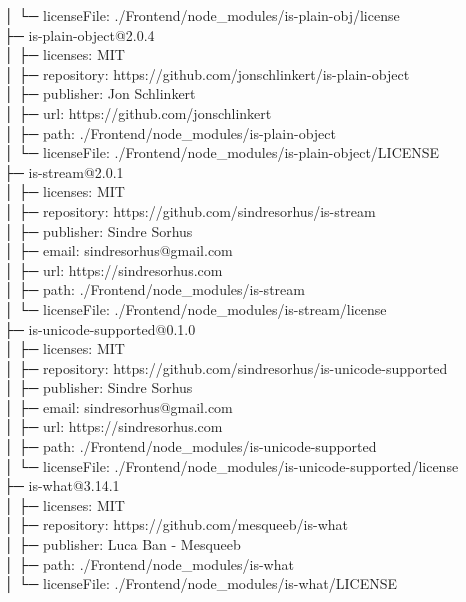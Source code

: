 \documentclass[
    paper=a4,
    twoside=false,
    parskip=half,
    listof=entryprefix,
    listof=totoc,
    index=totoc,
    bibliography=totoc,
    headsepline,
]{scrbook}
\begin{document}
    │  └─ licenseFile: ./Frontend/node\_modules/is-plain-obj/license\\
    ├─ is-plain-object@2.0.4\\
    │  ├─ licenses: MIT\\
    │  ├─ repository: https://github.com/jonschlinkert/is-plain-object\\
    │  ├─ publisher: Jon Schlinkert\\
    │  ├─ url: https://github.com/jonschlinkert\\
    │  ├─ path: ./Frontend/node\_modules/is-plain-object\\
    │  └─ licenseFile: ./Frontend/node\_modules/is-plain-object/LICENSE\\
    ├─ is-stream@2.0.1\\
    │  ├─ licenses: MIT\\
    │  ├─ repository: https://github.com/sindresorhus/is-stream\\
    │  ├─ publisher: Sindre Sorhus\\
    │  ├─ email: sindresorhus@gmail.com\\
    │  ├─ url: https://sindresorhus.com\\
    │  ├─ path: ./Frontend/node\_modules/is-stream\\
    │  └─ licenseFile: ./Frontend/node\_modules/is-stream/license\\
    ├─ is-unicode-supported@0.1.0\\
    │  ├─ licenses: MIT\\
    │  ├─ repository: https://github.com/sindresorhus/is-unicode-supported\\
    │  ├─ publisher: Sindre Sorhus\\
    │  ├─ email: sindresorhus@gmail.com\\
    │  ├─ url: https://sindresorhus.com\\
    │  ├─ path: ./Frontend/node\_modules/is-unicode-supported\\
    │  └─ licenseFile: ./Frontend/node\_modules/is-unicode-supported/license\\
    ├─ is-what@3.14.1\\
    │  ├─ licenses: MIT\\
    │  ├─ repository: https://github.com/mesqueeb/is-what\\
    │  ├─ publisher: Luca Ban - Mesqueeb\\
    │  ├─ path: ./Frontend/node\_modules/is-what\\
    │  └─ licenseFile: ./Frontend/node\_modules/is-what/LICENSE\\
\end{document}
